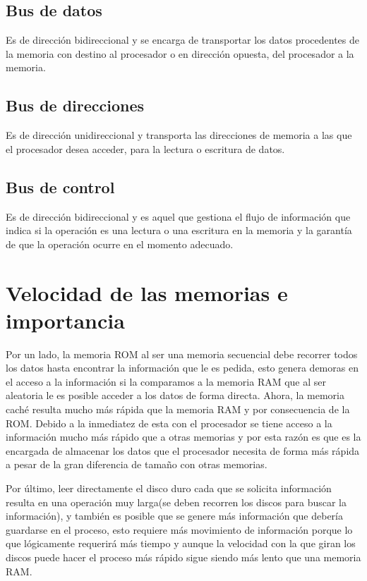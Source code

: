 \documentclass{article}
\begin{document}
\subsection{Bus de datos}
Es de dirección bidireccional y se encarga de transportar los datos procedentes de la memoria con destino al procesador o en dirección opuesta, del procesador a la memoria.

\subsection{Bus de direcciones}
Es de dirección unidireccional y transporta las direcciones de memoria a las que el procesador desea acceder, para la lectura o escritura de datos.

\subsection{Bus de control}
Es de dirección bidireccional y es aquel que gestiona el flujo de información que indica si la operación es una lectura o una escritura en la memoria y la garantía de que la operación ocurre en el momento adecuado.

\section{Velocidad de las memorias e importancia}
Por un lado, la memoria ROM al ser una memoria secuencial debe recorrer todos los datos hasta encontrar la información que le es pedida, esto genera demoras en el acceso a la información si la comparamos a la memoria RAM que al ser aleatoria le es posible acceder a los datos de forma directa. Ahora, la memoria caché resulta mucho más rápida que la memoria RAM y por consecuencia de la ROM. Debido a la inmediatez de esta con el procesador se tiene acceso a la información mucho más rápido que a otras memorias y por esta razón es que es la encargada de almacenar los datos que el procesador necesita de forma más rápida a pesar de la gran diferencia de tamaño con otras memorias.\par
\vspace{5mm}
Por último, leer directamente el disco duro cada que se solicita información resulta en una operación muy larga(se deben recorren los discos para buscar la información), y también es posible que se genere más información que debería guardarse en el proceso, esto requiere más movimiento de información porque lo que lógicamente requerirá más tiempo y aunque la velocidad con la que giran los discos puede hacer el proceso más rápido sigue siendo más lento que una memoria RAM.
\end{document}
